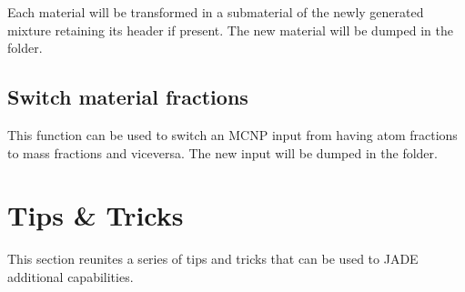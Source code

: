 \documentclass[letterpaper,10pt,english]{sphinxmanual}
\begin{document}
Each material will be transformed in a submaterial of the newly generated mixture
retaining its header if present. The new material will be dumped in the
 folder.


\section{Switch material fractions}
\label{\detokenize{usage/utilities:switch-material-fractions}}

This function can be used to switch an MCNP input from having atom fractions
to mass fractions and viceversa. The new input will be dumped in the
 folder.


\chapter{Tips \& Tricks}
\label{\detokenize{usage/tipstricks:tips-tricks}}\label{\detokenize{usage/tipstricks::doc}}
This section reunites a series of tips and tricks that can be used to 
JADE additional capabilities.
\end{document}
